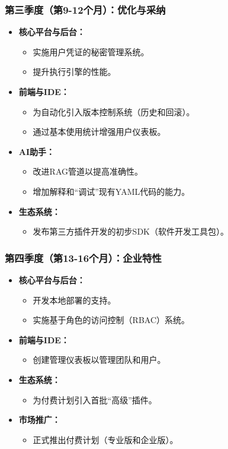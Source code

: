 \documentclass[11pt, a4paper, oneside]{article}
\begin{document}
\subsubsection*{第三季度（第9-12个月）：优化与采纳}
\begin{itemize}[leftmargin=*]
    \item \textbf{核心平台与后台：}
    \begin{itemize}
        \item 实施用户凭证的秘密管理系统。
        \item 提升执行引擎的性能。
    \end{itemize}
    \item \textbf{前端与IDE：}
    \begin{itemize}
        \item 为自动化引入版本控制系统（历史和回滚）。
        \item 通过基本使用统计增强用户仪表板。
    \end{itemize}
    \item \textbf{AI助手：}
    \begin{itemize}
        \item 改进RAG管道以提高准确性。
        \item 增加解释和“调试”现有YAML代码的能力。
    \end{itemize}
    \item \textbf{生态系统：}
    \begin{itemize}
        \item 发布第三方插件开发的初步SDK（软件开发工具包）。
    \end{itemize}
\end{itemize}

\subsubsection*{第四季度（第13-16个月）：企业特性}
\begin{itemize}[leftmargin=*]
    \item \textbf{核心平台与后台：}
    \begin{itemize}
        \item 开发本地部署的支持。
        \item 实施基于角色的访问控制（RBAC）系统。
    \end{itemize}
    \item \textbf{前端与IDE：}
    \begin{itemize}
        \item 创建管理仪表板以管理团队和用户。
    \end{itemize}
    \item \textbf{生态系统：}
    \begin{itemize}
        \item 为付费计划引入首批“高级”插件。
    \end{itemize}
    \item \textbf{市场推广：}
    \begin{itemize}
        \item 正式推出付费计划（专业版和企业版）。
    \end{itemize}
\end{itemize}
\end{document}
